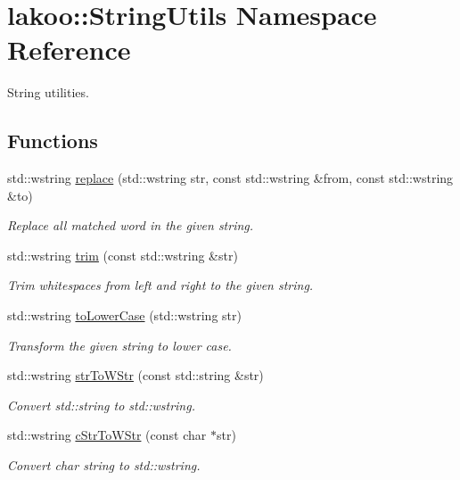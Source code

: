 \hypertarget{namespacelakoo_1_1_string_utils}{}\section{lakoo\+:\+:String\+Utils Namespace Reference}
\label{namespacelakoo_1_1_string_utils}


String utilities.  


\subsection*{Functions}
\begin{DoxyCompactItemize}
\item 
std\+::wstring \hyperlink{namespacelakoo_1_1_string_utils_ad236af80219ed789fd57d59cc2a380e7}{replace} (std\+::wstring str, const std\+::wstring \&from, const std\+::wstring \&to)
\begin{DoxyCompactList}\small\item\em Replace all matched word in the given string. \end{DoxyCompactList}\item 
std\+::wstring \hyperlink{namespacelakoo_1_1_string_utils_a102713d4f3bf83005f55de27a66d74df}{trim} (const std\+::wstring \&str)
\begin{DoxyCompactList}\small\item\em Trim whitespaces from left and right to the given string. \end{DoxyCompactList}\item 
std\+::wstring \hyperlink{namespacelakoo_1_1_string_utils_a990f13aaad5f2b94f4999b435bdc2be9}{to\+Lower\+Case} (std\+::wstring str)
\begin{DoxyCompactList}\small\item\em Transform the given string to lower case. \end{DoxyCompactList}\item 
std\+::wstring \hyperlink{namespacelakoo_1_1_string_utils_a24ac7b7c2b78ae88065b47ca076a05bc}{str\+To\+W\+Str} (const std\+::string \&str)
\begin{DoxyCompactList}\small\item\em Convert std\+::string to std\+::wstring. \end{DoxyCompactList}\item 
std\+::wstring \hyperlink{namespacelakoo_1_1_string_utils_abdaf50b4fed2e6f736df9aa735a4ac09}{c\+Str\+To\+W\+Str} (const char $\ast$str)
\begin{DoxyCompactList}\small\item\em Convert char string to std\+::wstring. \end{DoxyCompactList}\item 

\end{DoxyCompactItemize}
